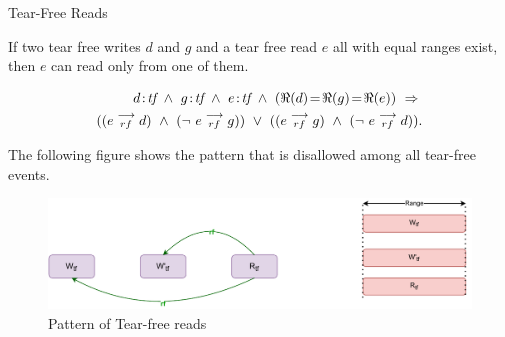 
        \begin{axiom}{Tear-Free Reads} 
            \label{TfRe}

            If two tear free writes $d$ and $g$ and a tear free read $e$ all with equal ranges exist, then $e$ can read only from one of them\footnotemark.
                
            \begin{align*}
                \et{d}{tf}\ \wedge\ \et{g}{tf} \ \wedge \ \et{e}{tf} 
                  \ \wedge \ 
                  (\Re(d) \!=\! \Re(g) \!=\! \Re(e)) 
                  \ \Rightarrow{} \\ 
                      ((\reln{e}{rf}{d}) 
                      \ \wedge \ 
                      (\neg \ \reln{e}{rf}{g})) 
                  \ \vee \  
                      ((\reln{e}{rf}{g}) 
                      \ \wedge \
                      (\neg \ \reln{e}{rf}{d})).
            \end{align*}
                    
            The following figure shows the pattern that is disallowed among all tear-free events. 
            \begin{figure}[H]
                \centering
                \includegraphics[scale=0.7]{4.ECMAScriptMemoryModel/TearFreeReads.pdf}
                \caption{Pattern of Tear-free reads}
            \end{figure}

        \end{axiom}

